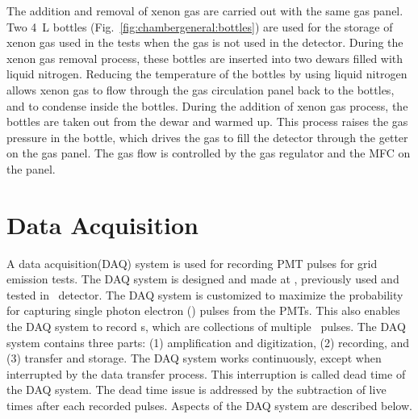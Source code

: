The addition and removal of xenon gas are carried out with the same gas panel. Two \SI{4}{\liter} bottles (Fig.~\ref{fig:chambergeneral:bottles}) are used for the storage of xenon gas used in the tests when the gas is not used in the detector. During the xenon gas removal process, these bottles are inserted into two dewars filled with liquid nitrogen. Reducing the temperature of the bottles by using liquid nitrogen allows xenon gas to flow through the gas circulation panel back to the bottles, and to condense inside the bottles. During the addition of xenon gas process, the bottles are taken out from the dewar and warmed up. This process raises the gas pressure in the bottle, which drives the gas to fill the detector through the getter on the gas panel. The gas flow is controlled by the gas regulator and the MFC on the panel.   

\section{Data Acquisition} %
\label{sec:gtest daq}
A data acquisition(DAQ) system is used for recording PMT pulses for grid emission tests. The DAQ system is designed and made at \slac , previously used and tested in \phaseone\ detector. The DAQ system is customized to maximize the probability for capturing single photon electron (\sphe ) pulses from the PMTs. This also enables the DAQ system to record \ees s, which are collections of multiple \sphe\ pulses. The DAQ system contains three parts: (1) amplification and digitization, (2) recording, and (3) transfer and storage. The DAQ system works continuously, except when interrupted by the data transfer process. This interruption is called dead time of the DAQ system. The dead time issue %
is addressed by the subtraction of live times after each recorded pulses. Aspects of the DAQ system are described below. %


